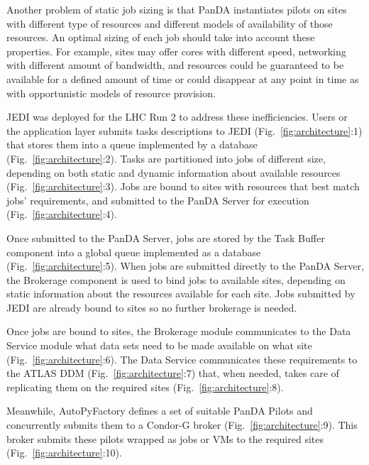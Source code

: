 Another problem of static job sizing is that PanDA instantiates pilots on sites
with different type of resources and different models of availability of those
resources. An optimal sizing of each job should take into account these
properties. For example, sites may offer cores with different speed, networking
with different amount of bandwidth, and resources could be guaranteed to be
available for a defined amount of time or could disappear at any point in time
as with opportunistic models of resource provision.

JEDI was deployed for the LHC Run 2 to address these inefficiencies. Users or
the application layer submits tasks descriptions to JEDI
(Fig.~\ref{fig:architecture}:1) that stores them into a queue implemented by a
database (Fig.~\ref{fig:architecture}:2). Tasks are partitioned into jobs of
different size, depending on both static and dynamic information about available
resources (Fig.~\ref{fig:architecture}:3). Jobs are bound to sites with
resources that best match jobs' requirements, and submitted to the PanDA Server
for execution (Fig.~\ref{fig:architecture}:4).

Once submitted to the PanDA Server, jobs are stored by the Task Buffer component
into a global queue implemented as a  database (Fig.~\ref{fig:architecture}:5).
When jobs are submitted directly to the PanDA Server, the Brokerage component is
used to bind jobs to available sites, depending on static information about the
resources available for each site. Jobs submitted by JEDI are already bound to
sites so no further brokerage is needed.

Once jobs are bound to sites, the Brokerage module communicates to the Data
Service module what data sets need to be made available on what site
(Fig.~\ref{fig:architecture}:6). The Data Service communicates these
requirements to the ATLAS DDM (Fig.~\ref{fig:architecture}:7) that, when needed,
takes care of %
replicating them on the required sites (Fig.~\ref{fig:architecture}:8).

Meanwhile, AutoPyFactory defines a set of suitable PanDA Pilots and concurrently
submits them to a Condor-G broker (Fig.~\ref{fig:architecture}:9). This broker
submits these pilots wrapped as jobs or VMs to the required sites
(Fig.~\ref{fig:architecture}:10).

